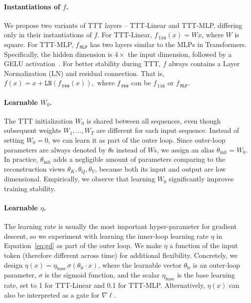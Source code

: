 \documentclass{article}
\begin{document}
\paragraph{Instantiations of $f$.} 
We propose two variants of TTT layers -- TTT-Linear and TTT-MLP, differing only in their instantiations of $f$.
For TTT-Linear, $f_{\,\texttt{lin}}(x) = Wx$, where $W$ is square.
For TTT-MLP, $f_{\,\texttt{MLP}}$ has two layers similar to the MLPs in Transformers.
Specifically, the hidden dimension is $4 \times$ the input dimension, followed by a GELU activation~\cite{hendrycks2016gaussian}.
For better stability during TTT, $f$ always contains a Layer Normalization (LN) and residual connection. That is,
$f(x) = x + \texttt{LN}(f_{\,\texttt{res}}(x)),$
where $f_{\,\texttt{res}}$ can be $f_{\,\texttt{lin}}$ or $f_{\,\texttt{MLP}}$.

\paragraph{Learnable $W_0$.} The TTT initialization $W_0$ is shared between all sequences, even though subsequent weights $W_1,\dots,W_T$ are different for each input sequence. 
Instead of setting $W_0 = 0$, we can learn it as part of the outer loop. 
Since outer-loop parameters are always denoted by $\theta$s instead of $W$s, we assign an alias $\theta_\text{init} = W_0$.
In practice,
$\theta_\text{init}$ adds a negligible amount of parameters comparing to the reconstruction views $\theta_K,\theta_Q,\theta_V$, because both its input and output are low dimensional.
Empirically, we observe that learning $W_0$ significantly improves training stability.

\paragraph{Learnable $\eta$.} The learning rate is usually the most important hyper-parameter for gradient descent, so we experiment with learning the inner-loop learning rate $\eta$ in Equation~\ref{eq:gd} as part of the outer loop.
We make $\eta$ a function of the input token (therefore different across time) for additional flexibility.
Concretely, we design $\eta(x) = \eta_\text{base}\,\sigma(\theta_\text{lr} \cdot x)$, where the learnable vector $\theta_\text{lr}$ is an outer-loop parameter, $\sigma$ is the sigmoid function, and the scalar $\eta_\text{base}$ is the base learning rate, set to 1 for TTT-Linear and 0.1 for TTT-MLP.
Alternatively, $\eta(x)$ can also be interpreted as a gate for $\nabla\ell$.
\end{document}
